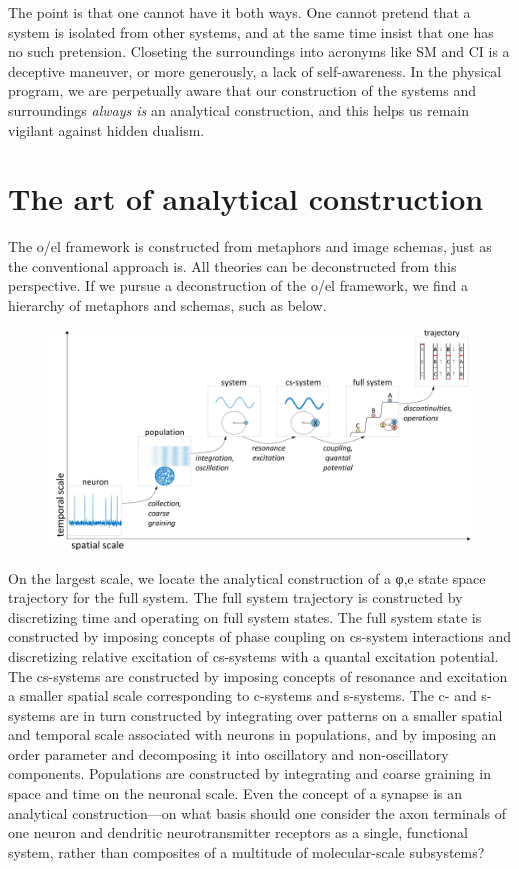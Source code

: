   The point is that one cannot have it both ways. One cannot pretend that a system is isolated from other systems, and at the same time insist that one has no such pretension. Closeting the surroundings into acronyms like SM and CI is a deceptive maneuver, or more generously, a lack of self-awareness. In the physical program, we are perpetually aware that our construction of the systems and surroundings \textit{always is} an analytical construction, and this helps us remain vigilant against hidden dualism.

\section{The art of analytical construction}

The o/el framework is constructed from metaphors and image schemas, just as the conventional approach is. All theories can be deconstructed from this perspective. If we pursue a deconstruction of the o/el framework, we find a hierarchy of metaphors and schemas, such as below. 

  
\begin{figure}
\includegraphics[width=\textwidth]{figures/Tilsen-img169.png}
\caption{\missingcaption}
\label{fig:}
\end{figure}
 

  On the largest scale, we locate the analytical construction of a φ,e state space trajectory for the full system. The full system trajectory is constructed by discretizing time and operating on full system states. The full system state is constructed by imposing concepts of phase coupling on cs-system interactions and discretizing relative excitation of cs-systems with a quantal excitation potential. The cs-systems are constructed by imposing concepts of resonance and excitation a smaller spatial scale corresponding to c-systems and s-systems. The c- and s-systems are in turn constructed by integrating over patterns on a smaller spatial and temporal scale associated with neurons in populations, and by imposing an order parameter and decomposing it into oscillatory and non-oscillatory components. Populations are constructed by integrating and coarse graining in space and time on the neuronal scale. Even the concept of a synapse is an analytical construction—on what basis should one consider the axon terminals of one neuron and dendritic neurotransmitter receptors as a single, functional system, rather than composites of a multitude of molecular-scale subsystems? 

